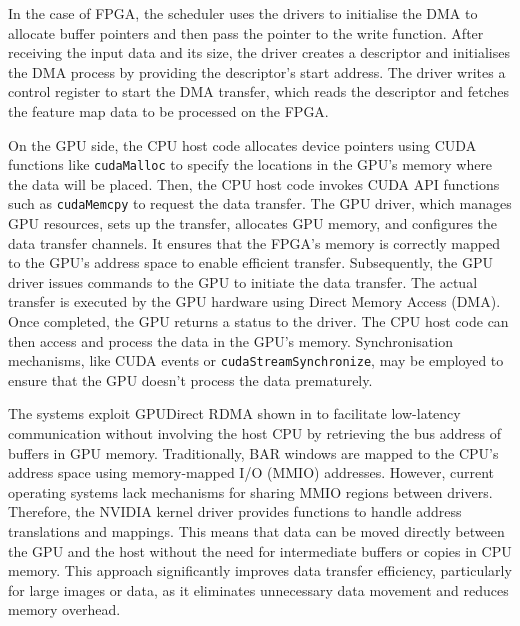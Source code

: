 
In the case of FPGA, the scheduler uses the drivers to initialise the DMA to allocate buffer pointers and then pass the pointer to the write function. After receiving the input data and its size, the driver creates a descriptor and initialises the DMA process by providing the descriptor's start address. The driver writes a control register to start the DMA transfer, which reads the descriptor and fetches the feature map data to be processed on the FPGA.

On the GPU side, the CPU host code allocates device pointers using CUDA functions like \texttt{cudaMalloc} to specify the locations in the GPU's memory where the data will be placed. Then, the CPU host code invokes CUDA API functions such as \texttt{cudaMemcpy} to request the data transfer. The GPU driver, which manages GPU resources, sets up the transfer, allocates GPU memory, and configures the data transfer channels. It ensures that the FPGA's memory is correctly mapped to the GPU's address space to enable efficient transfer. Subsequently, the GPU driver issues commands to the GPU to initiate the data transfer. The actual transfer is executed by the GPU hardware using Direct Memory Access (DMA). Once completed, the GPU returns a status to the driver. The CPU host code can then access and process the data in the GPU's memory. Synchronisation mechanisms, like CUDA events or \texttt{cudaStreamSynchronize}, may be employed to ensure that the GPU doesn't process the data prematurely.

The systems exploit GPUDirect RDMA shown in  to facilitate low-latency communication without involving the host CPU by retrieving the bus address of buffers in GPU memory. Traditionally, BAR windows are mapped to the CPU's address space using memory-mapped I/O (MMIO) addresses. However, current operating systems lack mechanisms for sharing MMIO regions between drivers. Therefore, the NVIDIA kernel driver provides functions to handle address translations and mappings. This means that data can be moved directly between the GPU and the host without the need for intermediate buffers or copies in CPU memory. This approach significantly improves data transfer efficiency, particularly for large images or data, as it eliminates unnecessary data movement and reduces memory overhead.





